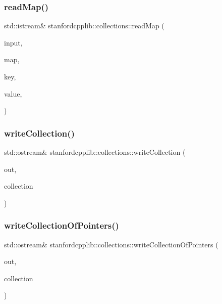 \subsubsection{\texorpdfstring{read\+Map()}{readMap()}}
{\footnotesize\ttfamily std\+::istream\& stanfordcpplib\+::collections\+::read\+Map (\begin{DoxyParamCaption}\item[{std\+::istream \&}]{input,  }\item[{Map\+Type \&}]{map,  }\item[{Key\+Type \&}]{key,  }\item[{Value\+Type \&}]{value,  }\item[{std\+::string}]{ }\end{DoxyParamCaption})}

\mbox{\label{namespacestanfordcpplib_1_1collections_aa0fa77893be51108c73f38f0baf30a02}} 
\subsubsection{\texorpdfstring{write\+Collection()}{writeCollection()}}
{\footnotesize\ttfamily std\+::ostream\& stanfordcpplib\+::collections\+::write\+Collection (\begin{DoxyParamCaption}\item[{std\+::ostream \&}]{out,  }\item[{Collection\+Type}]{collection }\end{DoxyParamCaption})}

\mbox{\label{namespacestanfordcpplib_1_1collections_a0476c2f41f266287172ae36ba9a66266}} 
\subsubsection{\texorpdfstring{write\+Collection\+Of\+Pointers()}{writeCollectionOfPointers()}}
{\footnotesize\ttfamily std\+::ostream\& stanfordcpplib\+::collections\+::write\+Collection\+Of\+Pointers (\begin{DoxyParamCaption}\item[{std\+::ostream \&}]{out,  }\item[{Collection\+Type}]{collection }\end{DoxyParamCaption})}

